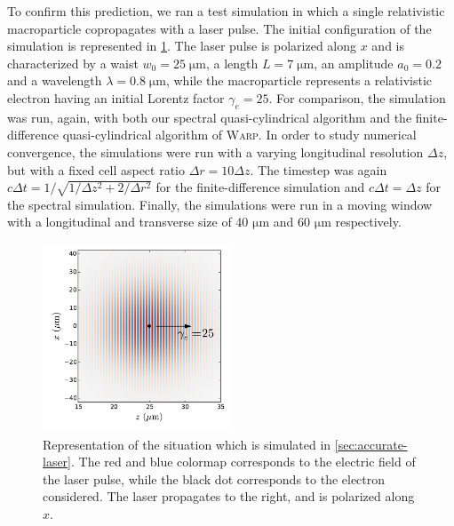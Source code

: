 \documentclass[1p,times]{elsarticle}
\begin{document}
To confirm this prediction, we ran a test simulation in which a single
relativistic macroparticle copropagates with a laser pulse. The initial configuration of
the simulation is represented in \cref{fig:Schematic_laser}. The laser
pulse is polarized along $x$ and is characterized by a waist $w_0 = 25\;\mathrm{\mu m}$,
a length $L=7\;\mathrm{\mu m}$, an amplitude $a_0 = 0.2$ and a
wavelength $\lambda = 0.8\;\mathrm{\mu m}$, while the macroparticle
represents a relativistic electron having an initial Lorentz factor
$\gamma_e = 25$. For comparison, the simulation was run, again, with both our spectral
quasi-cylindrical algorithm and the finite-difference
quasi-cylindrical algorithm of \textsc{Warp}. In order to study
numerical convergence, the simulations were run with a varying
longitudinal resolution $\Delta z$, but with a fixed cell aspect ratio
$\Delta r = 10\Delta z$. The timestep was again $c\Delta t=
1/\sqrt{1/\Delta z^2 + 2/\Delta r^2}$ for the finite-difference
simulation and $c\Delta t = \Delta z$ for the spectral
simulation. Finally, the simulations were run in a moving window with a
longitudinal and transverse size of 40 $\mathrm{\mu m}$ and 60 
$\mathrm{\mu m}$ respectively.

\begin{figure}[!h]
\centering
\includegraphics[width=0.5\textwidth]{figures/Schematic_laser.pdf}
\caption{\label{fig:Schematic_laser}Representation of the situation
  which is simulated in \cref{sec:accurate-laser}. The red and blue
  colormap corresponds to the electric field of the laser pulse, while
  the black dot corresponds to the electron considered. 
The laser propagates to the right, and is polarized along $x$.}
\end{figure}
\end{document}
